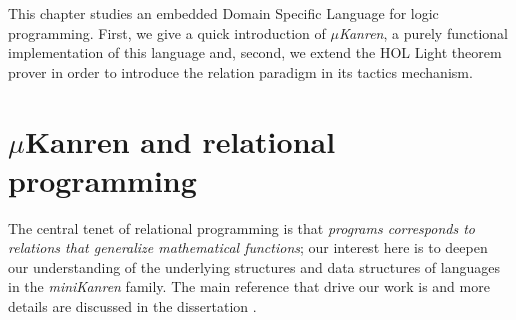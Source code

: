 
This chapter studies an embedded Domain Specific Language for logic
programming.  First, we give a quick introduction of \textit{$\mu$Kanren}, a
purely functional implementation of this language and, second, we extend the
HOL Light theorem prover in order to introduce the relation paradigm in its
tactics mechanism.

\section{$\mu$Kanren and relational programming}

The central tenet of relational programming is that \textit{programs
corresponds to relations that generalize mathematical functions}; our interest
here is to deepen our understanding of the underlying structures and data
structures of languages in the \textit{miniKanren} family. The main reference
that drive our work is \citep{Friedman:Reasoned:Schemer} and more details are
discussed in the dissertation \citep{Byrd:PhD}.

